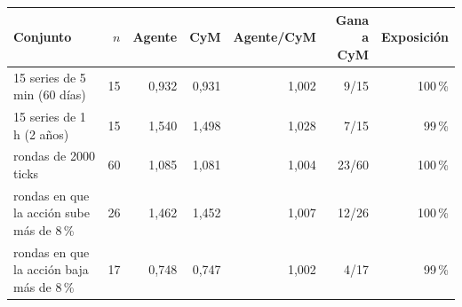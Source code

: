 \begin{tabular}{lrrrrrr}
\toprule
Conjunto & $n$ & Agente & CyM & Agente/CyM & Gana a CyM & Exposición \\
\midrule
15 series de 5 min (60 días) & 15 & 0,932 & 0,931 & 1,002 & 9/15 & 100\,\% \\
15 series de 1 h (2 años) & 15 & 1,540 & 1,498 & 1,028 & 7/15 & 99\,\% \\
rondas de 2000 ticks & 60 & 1,085 & 1,081 & 1,004 & 23/60 & 100\,\% \\
rondas en que la acción sube más de 8\,\% & 26 & 1,462 & 1,452 & 1,007 & 12/26 & 100\,\% \\
rondas en que la acción baja más de 8\,\% & 17 & 0,748 & 0,747 & 1,002 & 4/17 & 99\,\% \\
\bottomrule
\end{tabular}

